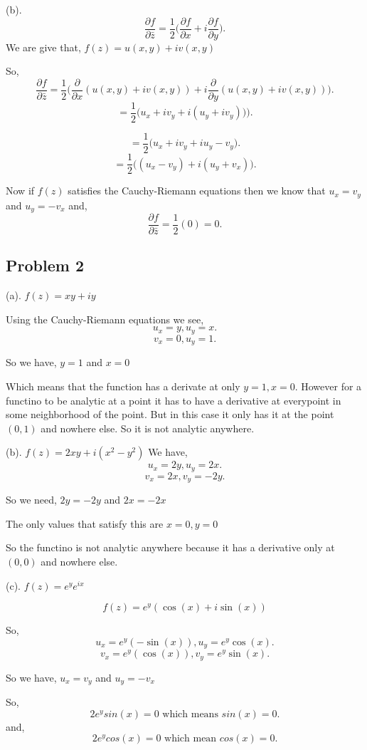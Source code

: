 \documentclass[a4paper]{report}
\begin{document}
(b). \[
    \frac{\partial  f}{\partial \bar z} = \frac{1}{2}\bigg(   \frac{\partial  f}{\partial x} + i  \frac{\partial  f}{\partial y} \bigg)
.\] 
We are give that, $f(z) = u(x,y) + iv(x,y)$

So, \[
    \frac{\partial  f}{\partial \bar z} = \frac{1}{2}\bigg(   \frac{\partial}{\partial x}(u(x,y) + iv(x,y)) + i  \frac{\partial  }{\partial y} (u(x,y) + iv(x,y))\bigg)
.\] 
\[
= \frac{1}{2}\bigg(   u_x + iv_y + i(u_y + iv_y))\bigg)
.\] 

\[
= \frac{1}{2}\bigg(   u_x + iv_y + iu_y - v_y\bigg)
.\] 
\[
= \frac{1}{2}\bigg((u_x - v_y)+ i(u_y + v_x)\bigg)
.\] 

Now if $f(z)$ satisfies the Cauchy-Riemann equations then we know that  $u_x = v_y$ and  $u_y = -v_x$ and,  \[
\frac{\partial f}{\partial \bar z} = \frac{1}{2}(0) = 0
.\] 


\subsection*{Problem 2}
(a). $f(z) = xy + iy$

Using the Cauchy-Riemann equations we see, \[
u_x = y, u_y = x
.\] 
\[
v_x = 0, u_y = 1
.\] 

So we have, $y = 1$ and $x = 0$

Which means that the function has a derivate at only  $y = 1, x= 0$. However for a functino to be analytic at a point it has to have a derivative at everypoint in some neighborhood of the point. But in this case it only has it at the point  $(0,1)$ and nowhere else. So it is not analytic anywhere.


(b). $f(z) = 2xy + i(x^2 - y^2)$
We have, \[
u_x = 2y, u_y = 2x
.\] 
\[
v_x = 2x, v_y = -2y
.\] 

So we need, $2y = -2y$ and $2x = -2x$

The only values that satisfy this are  $x = 0, y = 0$

So the functino is not analytic anywhere because it has a derivative only at  $(0,0)$ and nowhere else.

(c).  $f(z) = e^ye^{ix}$

$$f(z) = e^y(\cos(x) + i\sin(x))$$


So, \[
u_x = e^y(-\sin(x)), u_y = e^y\cos(x)
.\] 
\[
v_x = e^y(\cos(x)), v_y = e^y \sin(x)
.\] 

So we have, $u_x = v_y$ and $u_y = -v_x$

So,  \[
    2e^ysin(x) = 0 \text{ which means } sin(x) = 0
.\] 
and, \[
    2e^ycos(x) = 0 \text { which mean } cos(x) = 0
.\] 
\end{document}

